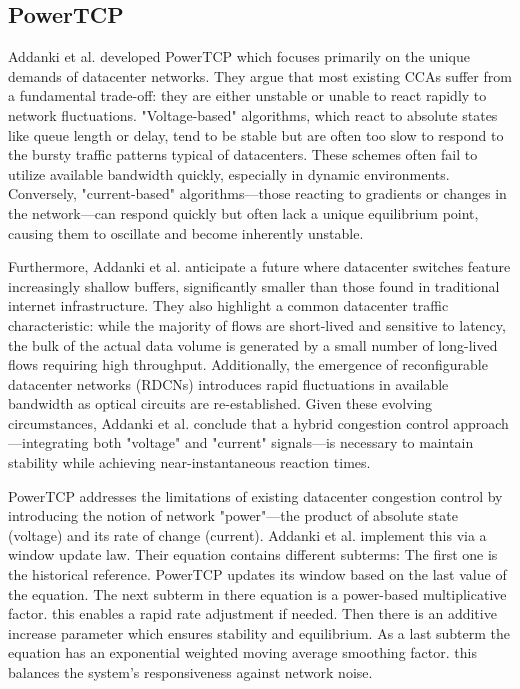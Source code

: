 \subsection{PowerTCP}

Addanki et al. \cite{PowerTCP} developed PowerTCP which focuses primarily on the unique demands of datacenter networks. 
They argue that most existing \acs{CCA}s suffer from a fundamental trade-off: 
they are either unstable or unable to react rapidly to network fluctuations. 
"Voltage-based" algorithms, which react to absolute states like queue length or delay, tend to be stable but are often too slow to respond to the bursty traffic patterns typical of datacenters. 
These schemes often fail to utilize available bandwidth quickly, especially in dynamic environments. 
Conversely, "current-based" algorithms—those reacting to gradients or changes in the network—can respond quickly but often lack a unique equilibrium point, causing them to oscillate and become inherently unstable.

Furthermore, Addanki et al. \cite{PowerTCP} anticipate a future where datacenter switches feature increasingly shallow buffers, significantly smaller than those found in traditional internet infrastructure. 
They also highlight a common datacenter traffic characteristic: while the majority of flows are short-lived and sensitive to latency, the bulk of the actual data volume is generated by a small number of long-lived flows requiring high throughput. 
Additionally, the emergence of reconfigurable datacenter networks (RDCNs) introduces rapid fluctuations in available bandwidth as optical circuits are re-established. 
Given these evolving circumstances, Addanki et al. conclude that a hybrid congestion control approach—integrating both "voltage" and "current" signals—is necessary to maintain stability while achieving near-instantaneous reaction times.

PowerTCP addresses the limitations of existing datacenter congestion control by introducing the notion of network "power"—the product of absolute state (voltage) and its rate of change (current). 
Addanki et al. implement this via a window update law.
Their equation contains different subterms:
The first one is the historical reference.
PowerTCP updates its window based on the last value of the equation.
The next subterm in there equation is a power-based multiplicative factor.
this enables a rapid rate adjustment if needed.
Then there is an additive increase parameter which ensures stability and equilibrium.
As a last subterm the equation has an exponential weighted moving average smoothing factor.
this balances the system's responsiveness against network noise. 

